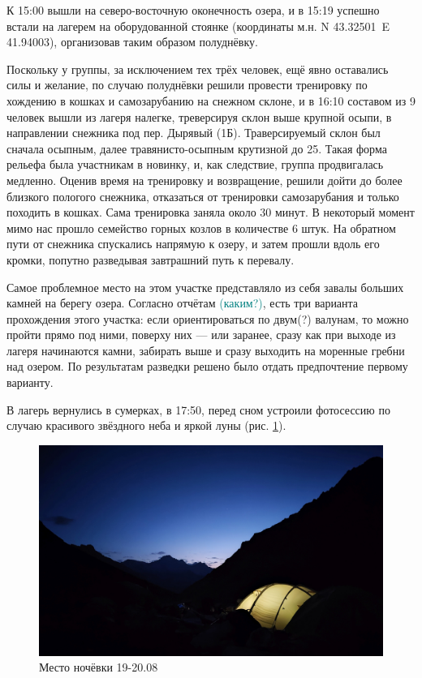 К 15:00 вышли на северо-восточную оконечность озера, и в 15:19 успешно встали на лагерем на оборудованной стоянке (координаты м.н. N 43.32501\degree~E 41.94003\degree), организовав таким образом полуднёвку.

Поскольку у группы, за исключением тех трёх человек, ещё явно оставались силы и желание, по случаю полуднёвки решили провести тренировку по хождению в кошках и самозарубанию на снежном склоне, и в 16:10 составом из 9 человек вышли из лагеря налегке, треверсируя склон выше крупной осыпи, в направлении снежника под пер. Дырявый (1Б). Траверсируемый склон был сначала осыпным, далее травянисто-осыпным крутизной до 25\degree. Такая форма рельефа была участникам в новинку, и, как следствие, группа продвигалась медленно. Оценив время на тренировку и возвращение, решили дойти до более близкого пологого снежника, отказаться от тренировки самозарубания и только походить в кошках. Сама тренировка заняла около 30 минут. В некоторый момент мимо нас прошло семейство горных козлов в количестве 6 штук.
На обратном пути от снежника спускались напрямую к озеру, и затем прошли вдоль его кромки, попутно разведывая завтрашний путь к перевалу. 

Самое проблемное место на этом участке представляло из себя завалы больших камней на берегу озера. Согласно отчётам \textcolor{teal}{(каким?)}, есть три варианта прохождения этого участка: если ориентироваться по двум\alert{(?)} валунам, то можно пройти прямо под ними, поверху них --- или заранее, сразу как при выходе из лагеря начинаются камни, забирать выше и сразу выходить на моренные гребни над озером. По результатам разведки решено было отдать предпочтение первому варианту.

В лагерь вернулись в сумерках, в 17:50, перед сном устроили фотосессию по случаю красивого звёздного неба и яркой луны (рис. \ref{fig:IMG_20240829_194851}).

\begin{figure}[h!]
	\centering
	\includegraphics[width=0.7\linewidth]{../pics/IMG_20240829_194851}
	\caption{Место ночёвки 19-20.08}
	\label{fig:IMG_20240829_194851}
\end{figure}

\clearpage